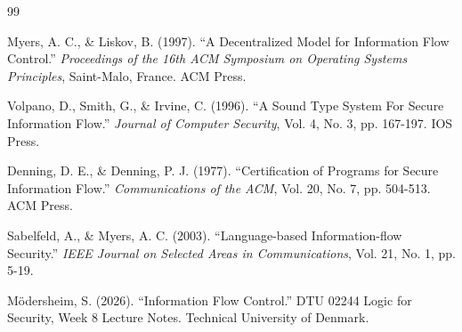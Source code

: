 \begin{thebibliography}{99}

Myers, A. C., \& Liskov, B. (1997).
``A Decentralized Model for Information Flow Control.''
\textit{Proceedings of the 16th ACM Symposium on Operating Systems Principles}, 
Saint-Malo, France. ACM Press.

Volpano, D., Smith, G., \& Irvine, C. (1996).
``A Sound Type System For Secure Information Flow.''
\textit{Journal of Computer Security}, Vol. 4, No. 3, pp. 167-197. IOS Press.

Denning, D. E., \& Denning, P. J. (1977).
``Certification of Programs for Secure Information Flow.''
\textit{Communications of the ACM}, Vol. 20, No. 7, pp. 504-513. ACM Press.

Sabelfeld, A., \& Myers, A. C. (2003).
``Language-based Information-flow Security.''
\textit{IEEE Journal on Selected Areas in Communications}, Vol. 21, No. 1, pp. 5-19.

Mödersheim, S. (2026).
``Information Flow Control.''
DTU 02244 Logic for Security, Week 8 Lecture Notes.
Technical University of Denmark.

\end{thebibliography}